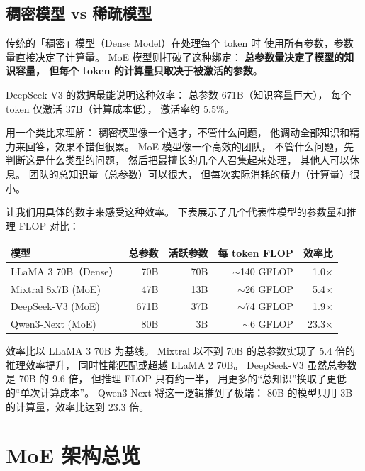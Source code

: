 \subsection{稠密模型 vs 稀疏模型}

传统的「稠密」模型（Dense Model）在处理每个 token 时
使用所有参数，参数量直接决定了计算量。
MoE 模型则打破了这种绑定：
\textbf{总参数量决定了模型的知识容量，
但每个 token 的计算量只取决于被激活的参数}。

DeepSeek-V3 的数据最能说明这种效率：
总参数 671B（知识容量巨大），
每个 token 仅激活 37B（计算成本低），
激活率约 5.5\%。

用一个类比来理解：
稠密模型像一个通才，不管什么问题，
他调动全部知识和精力来回答，效果不错但很累。
MoE 模型像一个高效的团队，
不管什么问题，先判断这是什么类型的问题，
然后把最擅长的几个人召集起来处理，
其他人可以休息。
团队的总知识量（总参数）可以很大，
但每次实际消耗的精力（计算量）很小。

让我们用具体的数字来感受这种效率。
下表展示了几个代表性模型的参数量和推理 FLOP 对比：

\begin{center}\small
\renewcommand{\arraystretch}{1.3}
\begin{tabular}{lrrrr}
\toprule
\rowcolor{figLightGray}
\textbf{模型} & \textbf{总参数} & \textbf{活跃参数} & \textbf{每 token FLOP}
& \textbf{效率比} \\
\midrule
LLaMA 3 70B（Dense） & 70B & 70B & $\sim$140 GFLOP & 1.0$\times$ \\
Mixtral 8x7B (MoE)   & 47B & 13B & $\sim$26 GFLOP  & 5.4$\times$ \\
DeepSeek-V3 (MoE)    & 671B & 37B & $\sim$74 GFLOP & 1.9$\times$ \\
Qwen3-Next (MoE)     & 80B & 3B  & $\sim$6 GFLOP   & 23.3$\times$ \\
\bottomrule
\end{tabular}
\end{center}

效率比以 LLaMA 3 70B 为基线。
Mixtral 以不到 70B 的总参数实现了 5.4 倍的推理效率提升，
同时性能匹配或超越 LLaMA 2 70B。
DeepSeek-V3 虽然总参数是 70B 的 9.6 倍，
但推理 FLOP 只有约一半，
用更多的“总知识”换取了更低的“单次计算成本”。
Qwen3-Next 将这一逻辑推到了极端：
80B 的模型只用 3B 的计算量，效率比达到 23.3 倍。

\section{MoE 架构总览}

